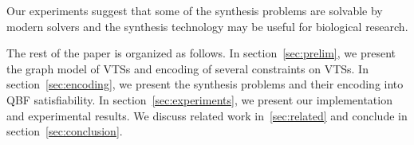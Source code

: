 Our experiments suggest that some of the synthesis problems are
solvable by modern solvers and the synthesis technology may be useful
for biological research.
%


The rest of the paper is organized as follows.
%
In section~\ref{sec:prelim}, we present the graph model of VTSs and encoding of several
constraints on VTSs.
%
In section~\ref{sec:encoding}, we present the synthesis problems and their
encoding into QBF satisfiability.
%
In section~\ref{sec:experiments}, we present our implementation and experimental results.
%
We discuss related work in~\ref{sec:related} and conclude in section~\ref{sec:conclusion}.

